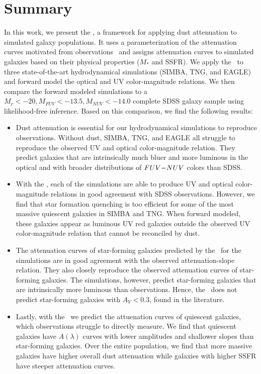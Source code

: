 \section{Summary}
In this work, we present the \eda, a framework for applying dust attenuation to
simulated galaxy populations. It uses a parameterization of 
the attenuation curves motivated from observations~\citep{noll2009} and
assigns attenuation curves to simulated galaxies based on their physical properties ($M_*$ and SSFR).
We apply the \eda~to 
three state-of-the-art hydrodynamical simulations (SIMBA, TNG, and EAGLE) and
forward model the optical and UV color-magnitude relations. We then compare
the forward modeled simulations to a $M_r < -20, M_{FUV} < -13.5, M_{NUV} <
-14.0$ complete SDSS galaxy sample using likelihood-free inference. Based on
this comparison, we find the following results: 

\begin{itemize}
    \item Dust attenuation is essential for our hydrodynamical simulations to
        reproduce observations.
        Without dust, SIMBA, TNG, and EAGLE all struggle to reproduce the
        observed UV and optical color-magnitude relation. 
        They predict galaxies that are intrinsically much bluer and more
        luminous in the optical and with broader distributions of $FUV{-}NUV$
        colors than SDSS. 
    \item With the \eda, each of the simulations are able to produce UV and
        optical color-magnitude relations in good agreement with SDSS
        observations. 
        However, we find that star formation quenching is too efficient for
        some of the most massive quiescent galaxies in SIMBA and TNG. 
        When forward modeled, these galaxies appear as luminous UV red
        galaxies outside the observed UV color-magnitude relation that 
        cannot be reconciled by dust. 
    \item The attenuation curves of star-forming galaxies predicted by the
        \eda~for the simulations are in good agreement with the observed
        attenuation-slope relation. 
        They also closely reproduce the observed attenuation curves
        of star-forming galaxies. 
        The simulations, however, predict star-forming galaxies that are
        intrinsically more luminous than observations. Hence, the \eda~does
        not predict star-forming galaxies with $A_V < 0.3$, found in the
        literature. 
    \item Lastly, with the \eda~we predict the attuenation curves of
        quiescent galaxies, which observations struggle to directly
        measure.
        We find that quiescent galaxies have $A(\lambda)$ curves
        with lower amplitudes and shallower slopes than star-forming
        galaxies. 
        Over the entire population, we find that more massive galaxies have
        higher overall dust attenuation while galaxies with higher SSFR
        have steeper attenuation curves. 
\end{itemize}

